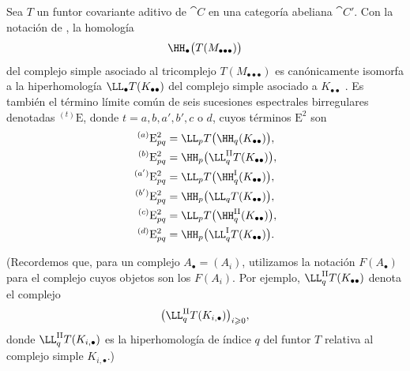\documentclass[oneside]{amsart}
\renewcommand{\geq}{\geqslant}
\newcommand{\oldpage}[2][]{{\marginnote{\normalfont\textbf{#1}~|~#2}}\ignorespaces}
\let\EGAOriginalLabel\label
\renewcommand{\label}[1]{\phantomsection\EGAOriginalLabel{#1}}
\begin{document}
\begin{proposition}[11.7.2]
\label{0.11.7.2}
Sea $T$ un funtor covariante aditivo de $\cat{C}$ en una categoría
abeliana $\cat{C}'$.
Con la notación de , la homología
\[
  \HH_\bullet\bigl(T(M_{\bullet\bullet\bullet})\bigr)
\]
del complejo simple asociado al tricomplejo
$T(M_{\bullet\bullet\bullet})$ es canónicamente isomorfa a la
hiperhomología $\LL_\bullet T(K_{\bullet\bullet})$ del
\oldpage[0\textsubscript{III}]{42}
complejo simple asociado a $K_{\bullet\bullet}$
.
Es también el término límite común de seis sucesiones espectrales birregulares denotadas
${}^{(t)}\mathrm{E}$, donde $t=a,b,a',b',c$ o $d$, cuyos
términos $\mathrm{E}^2$ son
\[
\begin{aligned}
  {}^{(a)}\mathrm{E}^2_{pq}
    &= \LL_pT\bigl(\HH_q(K_{\bullet\bullet})\bigr),\\
  {}^{(b)}\mathrm{E}^2_{pq}
    &= \HH_p\bigl(\LL^{\mathrm{II}}_qT(K_{\bullet\bullet})\bigr),\\
  {}^{(a')}\mathrm{E}^2_{pq}
    &= \LL_pT\bigl(\HH^{\mathrm{I}}_q(K_{\bullet\bullet})\bigr),\\
  {}^{(b')}\mathrm{E}^2_{pq}
    &= \HH_p\bigl(\LL_qT(K_{\bullet\bullet})\bigr),\\
  {}^{(c)}\mathrm{E}^2_{pq}
    &= \LL_pT\bigl(\HH^{\mathrm{II}}_q(K_{\bullet\bullet})\bigr),\\
  {}^{(d)}\mathrm{E}^2_{pq}
    &= \HH_p\bigl(\LL^{\mathrm{I}}_qT(K_{\bullet\bullet})\bigr).
\end{aligned}
\]
\end{proposition}

(Recordemos que, para un complejo $A_\bullet=(A_i)$, utilizamos la notación
$F(A_\bullet)$ para el complejo cuyos objetos son los $F(A_i)$.
Por ejemplo, $\LL^{\mathrm{II}}_qT(K_{\bullet\bullet})$ denota el complejo
\[
  \bigl(\LL^{\mathrm{II}}_qT(K_{i,\bullet})\bigr)_{i\geq 0},
\]
donde $\LL^{\mathrm{II}}_qT(K_{i,\bullet})$ es la hiperhomología de índice
$q$ del funtor $T$ relativa al complejo simple $K_{i,\bullet}$.)
\end{document}
